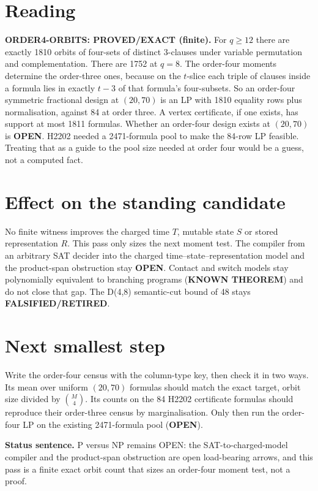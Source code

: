 \documentclass[11pt]{article}
\begin{document}
\section*{Reading}
\textbf{ORDER4-ORBITS: PROVED/EXACT (finite).} For $q\ge12$ there are exactly 1810 orbits of four-sets of distinct 3-clauses under variable permutation and complementation. There are 1752 at $q=8$. The order-four moments determine the order-three ones, because on the $t$-slice each triple of clauses inside a formula lies in exactly $t-3$ of that formula's four-subsets. So an order-four symmetric fractional design at $(20,70)$ is an LP with 1810 equality rows plus normalisation, against 84 at order three. A vertex certificate, if one exists, has support at most 1811 formulas. Whether an order-four design exists at $(20,70)$ is \textbf{OPEN}. H2202 needed a 2471-formula pool to make the 84-row LP feasible. Treating that as a guide to the pool size needed at order four would be a guess, not a computed fact.

\section*{Effect on the standing candidate}
No finite witness improves the charged time $T$, mutable state $S$ or stored representation $R$. This pass only sizes the next moment test. The compiler from an arbitrary SAT decider into the charged time--state--representation model and the product-span obstruction stay \textbf{OPEN}. Contact and switch models stay polynomially equivalent to branching programs (\textbf{KNOWN THEOREM}) and do not close that gap. The D(4,8) semantic-cut bound of 48 stays \textbf{FALSIFIED/RETIRED}.

\section*{Next smallest step}
Write the order-four census with the column-type key, then check it in two ways. Its mean over uniform $(20,70)$ formulas should match the exact target, orbit size divided by $\binom M4$. Its counts on the 84 H2202 certificate formulas should reproduce their order-three census by marginalisation. Only then run the order-four LP on the existing 2471-formula pool (\textbf{OPEN}).

\bigskip
\noindent\textbf{Status sentence.} P versus NP remains OPEN: the SAT-to-charged-model compiler and the product-span obstruction are open load-bearing arrows, and this pass is a finite exact orbit count that sizes an order-four moment test, not a proof.
\end{document}
